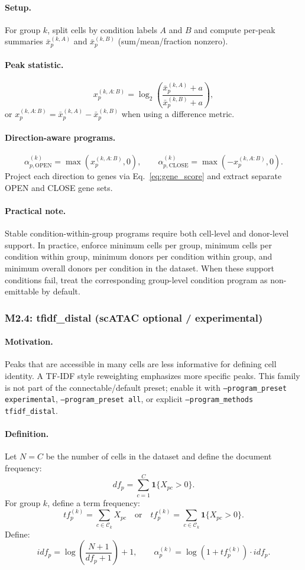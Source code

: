 \documentclass[11pt]{article}
\begin{document}
\paragraph{Setup.} For group $k$, split cells by condition labels $A$ and $B$ and compute per-peak summaries $\bar{x}^{(k,A)}_p$ and $\bar{x}^{(k,B)}_p$ (sum/mean/fraction nonzero).
\paragraph{Peak statistic.}
\[
x_p^{(k,A\!:\!B)}=
\log_2\left(\frac{\bar{x}^{(k,A)}_p+a}{\bar{x}^{(k,B)}_p+a}\right),
\]
or $x_p^{(k,A\!:\!B)}=\bar{x}^{(k,A)}_p-\bar{x}^{(k,B)}_p$ when using a difference metric.
\paragraph{Direction-aware programs.}
\[
\alpha_{p,\mathrm{OPEN}}^{(k)}=\max(x_p^{(k,A\!:\!B)},0), \qquad
\alpha_{p,\mathrm{CLOSE}}^{(k)}=\max(-x_p^{(k,A\!:\!B)},0).
\]
Project each direction to genes via Eq.\ \ref{eq:gene_score} and extract separate OPEN and CLOSE gene sets.
\paragraph{Practical note.} Stable condition-within-group programs require both cell-level and donor-level support. In practice, enforce minimum cells per group, minimum cells per condition within group, minimum donors per condition within group, and minimum overall donors per condition in the dataset. When these support conditions fail, treat the corresponding group-level condition program as non-emittable by default.

\subsubsection{M2.4: tfidf\_distal (scATAC optional / experimental)}
\paragraph{Motivation.} Peaks that are accessible in many cells are less informative for defining cell identity.
A TF-IDF style reweighting emphasizes more specific peaks.
This family is not part of the connectable/default preset; enable it with \texttt{--program\_preset experimental}, \texttt{--program\_preset all}, or explicit \texttt{--program\_methods tfidf\_distal}.
\paragraph{Definition.} Let $N=C$ be the number of cells in the dataset and define the document frequency:
\[
df_p = \sum_{c=1}^C \mathbf{1}\{X_{pc}>0\}.
\]
For group $k$, define a term frequency:
\[
tf_{p}^{(k)} = \sum_{c\in\mathcal{C}_k} X_{pc} \quad \text{or} \quad tf_{p}^{(k)} = \sum_{c\in\mathcal{C}_k} \mathbf{1}\{X_{pc}>0\}.
\]
Define:
\begin{equation}
idf_p = \log\left(\frac{N+1}{df_p+1}\right) + 1,
\qquad
\alpha_p^{(k)} = \log(1+tf_{p}^{(k)}) \cdot idf_p.
\label{eq:tfidf}
\end{equation}
\end{document}
